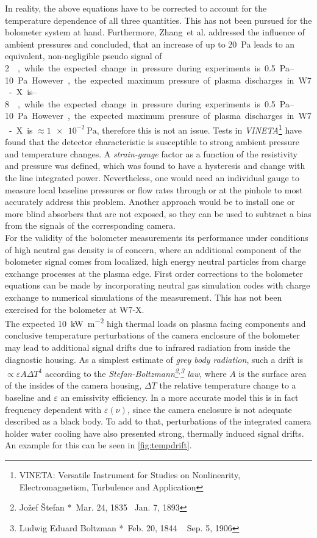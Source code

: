                 In reality, the above equations have to be corrected to account for the temperature dependence of all three quantities.  This has not been pursued for the bolometer system at hand. Furthermore, Zhang~et al. addressed the influence\cite{Zhang2009} of ambient pressures and concluded, that an increase of up to \SI{20}{\pascal} leads to an equivalent, non-negligible pseudo signal of \SIrange{2}{8}{\watt\per\meter\square\per\pascal}, while the expected change in pressure during experiments is \SIrange{0.5}{10}{\pascal}. However, the expected maximum pressure of plasma discharges in W7-X is $\approx\SI{1e-2}{\pascal}$, therefore this is not an issue. Tests in \textit{VINETA}\footnote[1]{VINETA: Versatile Instrument for Studies on Nonlinearity, Electromagnetism, Turbulence and Application} have found that the detector characteristic is susceptible to strong ambient pressure and temperature changes. A \textit{strain-gauge} factor as a function of the resistivity and pressure was defined, which was found to have a hysteresis and change with the line integrated power\cite{Zhang2008}. Nevertheless, one would need an individual gauge to measure local baseline pressures or flow rates through or at the pinhole to most accurately address this problem. Another approach would be to install one or more blind absorbers that are not exposed, so they can be used to subtract a bias from the signals of the corresponding camera.\\%
                For the validity of the bolometer measurements its performance under conditions of high neutral gas density is of concern, where an additional component of the bolometer signal comes from localized, high energy neutral particles from charge exchange processes at the plasma edge. First order corrections to the bolometer equations can be made by incorporating neutral gas simulation codes with charge exchange to numerical simulations of the measurement\cite{Giannone1997}. This has not been exercised for the bolometer at W7-X.\\%
                The expected \SI{10}{\kilo\watt\per\square\meter} high thermal loads on plasma facing components and conclusive temperature perturbations of the camera enclosure of the bolometer may lead to additional signal drifts due to infrared radiation from inside the diagnostic housing. As a simplest estimate of \textit{grey body radiation}, such a drift is $\propto \varepsilon A\Delta T^{4}$ according to the \textit{Stefan-Boltzmann\footnote[1]{Jožef Štefan *~Mar. 24, 1835 \textdagger~Jan. 7, 1893}$^{, }$\footnote[2]{Ludwig Eduard Boltzman *~Feb. 20, 1844 \textdagger~ Sep. 5, 1906} law}, where $A$ is the surface area of the insides of the camera housing, $\Delta T$ the relative temperature change to a baseline and $\varepsilon$ an emissivity efficiency. In a more accurate model this is in fact frequency dependent with $\varepsilon\left(\nu\right)$, since the camera enclosure is not adequate described as a black body. To add to that, perturbations of the integrated camera holder water cooling have also presented strong, thermally induced signal drifts. An example for this can be seen in \cref{fig:tempdrift}.\\%
